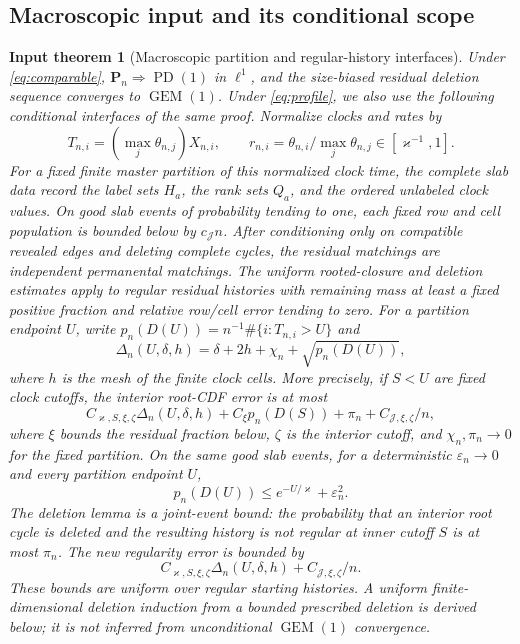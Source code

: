 \documentclass[11pt]{article}
\numberwithin{equation}{section}
\newcommand{\PD}{\operatorname{PD}}
\newcommand{\GEM}{\operatorname{GEM}}
\newtheorem{inputtheorem}[theorem]{Input theorem}
\theoremstyle{definition}
\theoremstyle{remark}
\begin{document}
\subsection{Macroscopic input and its conditional scope}
\begin{inputtheorem}[Macroscopic partition and regular-history interfaces]
\label{input:PD}
Under \eqref{eq:comparable}, $\mathbf P_n\Rightarrow\PD(1)$ in $\ell^1$,
and the size-biased residual deletion sequence converges to $\GEM(1)$.
Under \eqref{eq:profile}, we also use the following conditional interfaces
of the same proof.  Normalize clocks and rates by
\[
 T_{n,i}=(\max_j\theta_{n,j})X_{n,i},\qquad
 r_{n,i}=\theta_{n,i}/\max_j\theta_{n,j}\in[\varkappa^{-1},1].
\]
For a fixed finite master partition of this normalized clock time, the
complete slab data record the label sets $H_a$, the rank sets $Q_a$, and the ordered
\emph{unlabeled} clock values.  On good slab events of probability tending
to one, each fixed row and cell population is bounded below by
$c_{\mathcal J}n$.
After conditioning only on compatible revealed edges and deleting complete
cycles, the residual matchings are independent permanental matchings.
The uniform rooted-closure and deletion estimates apply to regular residual
histories with remaining mass at least a fixed positive fraction and
relative row/cell error tending to zero.  For a partition endpoint $U$,
write $p_n(D(U))=n^{-1}\#\{i:T_{n,i}>U\}$ and
\[
 \Delta_n(U,\delta,h)
 =\delta+2h+\chi_n+\sqrt{p_n(D(U))},
\]
where $h$ is the mesh of the finite clock cells.  More precisely, if
$S<U$ are fixed clock cutoffs, the interior root-CDF error is at most
\begin{equation}\label{eq:imported-root-error}
 C_{\varkappa,S,\xi,\zeta}\Delta_n(U,\delta,h)
 +C_\xi p_n(D(S))+\pi_n+C_{\mathcal J,\xi,\zeta}/n,
\end{equation}
where $\xi$ bounds the residual fraction below, $\zeta$ is the interior
cutoff, and $\chi_n,\pi_n\to0$ for the fixed partition.  On the same good
slab events, for a deterministic $\varepsilon_n\to0$ and every partition
endpoint $U$,
\begin{equation}\label{eq:imported-tail-bound}
 p_n(D(U))\le e^{-U/\varkappa}+\varepsilon_n^2.
\end{equation}
The deletion lemma is a \emph{joint-event} bound: the probability that an
interior root cycle is deleted and the resulting history is not regular
at inner cutoff $S$ is at most $\pi_n$.  The new regularity error is
bounded by
\begin{equation}\label{eq:imported-deletion-error}
 C_{\varkappa,S,\xi,\zeta}\Delta_n(U,\delta,h)
 +C_{\mathcal J,\xi,\zeta}/n.
\end{equation}
These bounds are uniform over regular starting histories.  A uniform
finite-dimensional deletion induction from a bounded prescribed deletion
is derived below; it is not inferred from unconditional $\GEM(1)$
convergence.
\end{inputtheorem}
\end{document}
